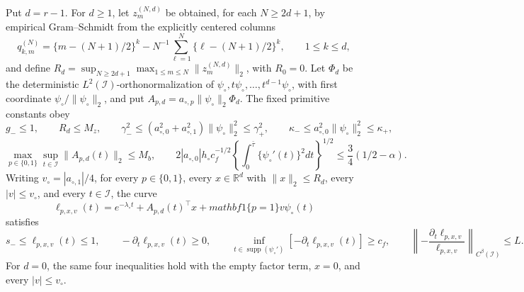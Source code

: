 Put \(d=r-1\).  For \(d\ge1\), let \(z_m^{(N,d)}\) be obtained, for each \(N\ge2d+1\), by empirical Gram--Schmidt from the explicitly centered columns
\[
 q_{k,m}^{(N)}=\{m-(N+1)/2\}^k-N^{-1}\sum_{\ell=1}^{N}\{\ell-(N+1)/2\}^k,
 \qquad 1\le k\le d,
\]
and define \(R_d=\sup_{N\ge2d+1}\max_{1\le m\le N}\|z_m^{(N,d)}\|_2\), with \(R_0=0\).  Let \(\Phi_d\) be the deterministic \(L^2(\mathcal I)\)-orthonormalization of \(\psi_\circ,t\psi_\circ,\ldots,t^{d-1}\psi_\circ\), with first coordinate \(\psi_\circ/\|\psi_\circ\|_2\), and put \(A_{p,d}=a_{\circ,p}\|\psi_\circ\|_2\Phi_d\).  The fixed primitive constants obey
\[
 g_-\le1,
 \qquad
 R_d\le M_z,
 \qquad
 \gamma_-^2\le(a_{\circ,0}^2+a_{\circ,1}^2)\|\psi_\circ\|_2^2\le\gamma_+^2,
 \qquad
 \kappa_-\le a_{\circ,0}^2\|\psi_\circ\|_2^2\le\kappa_+,
\]
\[
 \max_{p\in\{0,1\}}\sup_{t\in\mathcal I}\|A_{p,d}(t)\|_2\le M_b,
 \qquad
 2|a_{\circ,0}|h_\circ c_f^{-1/2}
 \left\{\int_0^{\bar\tau}\{\psi_\circ'(t)\}^2dt\right\}^{1/2}
 \le\frac34(1/2-\alpha).
\]
Writing \(v_\circ=|a_{\circ,1}|/4\), for every \(p\in\{0,1\}\), every \(x\in\mathbb R^d\) with \(\|x\|_2\le R_d\), every \(|v|\le v_\circ\), and every \(t\in\mathcal I\), the curve
\[
 \ell_{p,x,v}(t)=e^{-\lambda_\circ t}+A_{p,d}(t)^\top x+mathbf 1\{p=1\}v\psi_\circ(t)
\]
satisfies
\[
 s_-\le\ell_{p,x,v}(t)\le1,
 \qquad
 -\partial_t\ell_{p,x,v}(t)\ge0,
 \qquad
 \inf_{t\in\operatorname{supp}(\psi_\circ')}[-\partial_t\ell_{p,x,v}(t)]\ge c_f,
 \qquad
 \left\|-\frac{\partial_t\ell_{p,x,v}}{\ell_{p,x,v}}\right\|_{C^\beta(\mathcal I)}\le L.
\]
For \(d=0\), the same four inequalities hold with the empty factor term, \(x=0\), and every \(|v|\le v_\circ\).